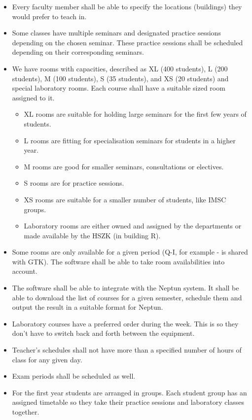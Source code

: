 \begin{itemize}
\item Every faculty member shall be able to specify the locations (buildings) they would prefer to teach in.
\item Some classes have multiple seminars and designated practice sessions depending on the chosen seminar. These practice sessions shall be scheduled depending on their corresponding seminars.
\item We have rooms with capacities, described as XL (400 students), L (200 students), M (100 students), S (35 students), and XS (20 students) and special laboratory rooms. Each course shall have a suitable sized room assigned to it.
\begin{itemize}
    \item XL rooms are suitable for holding large seminars for the first few years of students.
    \item L rooms are fitting for specialisation seminars for students in a higher year.
    \item M rooms are good for smaller seminars, consultations or electives.
    \item S rooms are for practice sessions.
    \item XS rooms are suitable for a smaller number of students, like IMSC groups.
    \item Laboratory rooms are either owned and assigned by the departments or made available by the HSZK (in building R).
\end{itemize}
\item Some rooms are only available for a given period (Q-I, for example - is shared with GTK). The software shall be able to take room availabilities into account.
\item The software shall be able to integrate with the Neptun system. It shall be able to download the list of courses for a given semester, schedule them and output the result in a suitable format for Neptun.
\item Laboratory courses have a preferred order during the week. This is so they don't have to switch back and forth between the equipment.  
\item Teacher's schedules shall not have more than a specified number of hours of class for any given day.
\item Exam periods shall be scheduled as well.  
\item For the first year students are arranged in groups. Each student group has an assigned timetable so they take their practice sessions and laboratory classes together.

\end{itemize}
